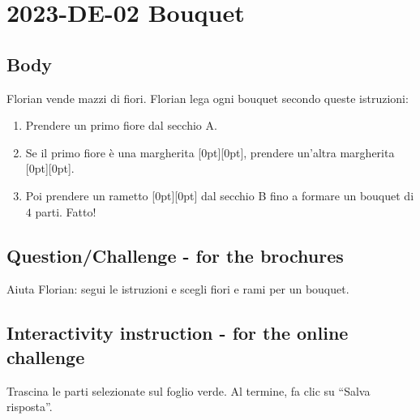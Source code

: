 \documentclass[a4paper,11pt]{report}
\newcommand{\taskGraphicsFolder}{..}
\begin{document}
\section*{\centering{} 2023-DE-02 Bouquet}


\subsection*{Body}

{\centering%
\par}

Florian vende mazzi di fiori. Florian lega ogni bouquet secondo queste istruzioni:

\begin{enumerate}
  \item Prendere un primo fiore dal secchio A.
  \item Se il primo fiore è una margherita \raisebox{\dimexpr -0.5ex -1.0ex \relax}[0pt][0pt]{}, prendere un’altra margherita \raisebox{\dimexpr -0.5ex -1.0ex \relax}[0pt][0pt]{}.
  \item Poi prendere un rametto \raisebox{\dimexpr -0.5ex -0.5ex \relax}[0pt][0pt]{} dal secchio B fino a formare un bouquet di $4$ parti. Fatto!
\end{enumerate}

{\em


\subsection*{Question/Challenge - for the brochures}

Aiuta Florian: segui le istruzioni e scegli fiori e rami per un bouquet.

{\centering%
\par}

}


\subsection*{Interactivity instruction - for the online challenge}

Trascina le parti selezionate sul foglio verde. Al termine, fa clic su \enquote{Salva risposta}.
\end{document}
